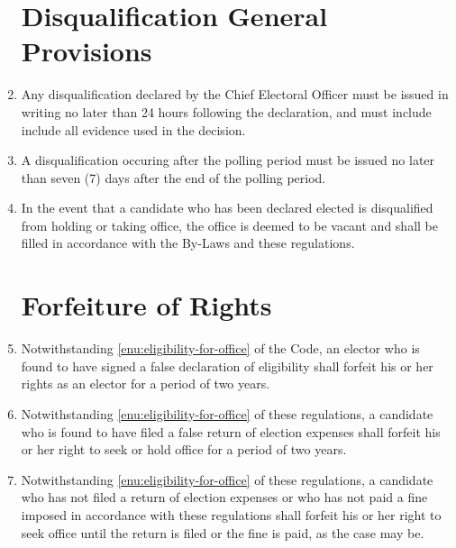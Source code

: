 \documentclass[oneside]{book}
\begin{document}
\begin{enumerate}
\section{Disqualification General Provisions}
\item \label{dq-issuance}Any disqualification declared by the Chief Electoral
Officer must be issued in writing no later than 24 hours following
the declaration, and must include include all evidence used in the
decision.
\item A disqualification occuring after the polling period must be issued
no later than seven (7) days after the end of the polling period.
\item In the event that a candidate who has been declared elected is disqualified
from holding or taking office, the office is deemed to be vacant and
shall be filled in accordance with the By-Laws and these regulations.

\section{Forfeiture of Rights}
\item Notwithstanding \autoref{enu:eligibility-for-office} of the Code,
an elector who is found to have signed a false declaration of eligibility
shall forfeit his or her rights as an elector for a period of two
years.
\item Notwithstanding \autoref{enu:eligibility-for-office} of these
regulations, a candidate who is found to have filed a false return
of election expenses shall forfeit his or her right to seek or hold
office for a period of two years. 
\item Notwithstanding \autoref{enu:eligibility-for-office} of these
regulations, a candidate who has not filed a return of election expenses
or who has not paid a fine imposed in accordance with these regulations
shall forfeit his or her right to seek office until the return is
filed or the fine is paid, as the case may be.


\end{enumerate}
\end{document}
